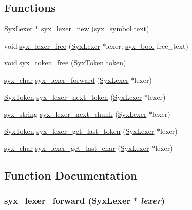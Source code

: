 \subsection*{Functions}
\begin{CompactItemize}
\item 
\hyperlink{struct_syx_lexer}{SyxLexer} $\ast$ \hyperlink{syx-lexer_8c_a9c6c122b1b37e06487284478ba914e1}{syx\_\-lexer\_\-new} (\hyperlink{syx-types_8h_9663af54b7b72f5d8be5f754ef356525}{syx\_\-symbol} text)
\item 
void \hyperlink{syx-lexer_8c_d89a4d0325732438808e9777acd52668}{syx\_\-lexer\_\-free} (\hyperlink{struct_syx_lexer}{SyxLexer} $\ast$lexer, \hyperlink{syx-types_8h_c6dc09b276b99fa1956364359139daab}{syx\_\-bool} free\_\-text)
\item 
void \hyperlink{syx-lexer_8c_5e759dcd70d8f633018d9687de77ff1e}{syx\_\-token\_\-free} (\hyperlink{struct_syx_token}{SyxToken} token)
\item 
\hyperlink{syx-types_8h_22636fad803dd674d2640c323df20a11}{syx\_\-char} \hyperlink{syx-lexer_8c_4fe0090bc88c108a076eed9a28126b2e}{syx\_\-lexer\_\-forward} (\hyperlink{struct_syx_lexer}{SyxLexer} $\ast$lexer)
\item 
\hyperlink{struct_syx_token}{SyxToken} \hyperlink{syx-lexer_8c_3d0ff30aeb654ef8a933b906f96dc483}{syx\_\-lexer\_\-next\_\-token} (\hyperlink{struct_syx_lexer}{SyxLexer} $\ast$lexer)
\item 
\hyperlink{syx-types_8h_1bff1fd86072dd98849437bc9dcb35c3}{syx\_\-string} \hyperlink{syx-lexer_8c_b3f87e9420db1b5b6db7b5534d27411b}{syx\_\-lexer\_\-next\_\-chunk} (\hyperlink{struct_syx_lexer}{SyxLexer} $\ast$lexer)
\item 
\hyperlink{struct_syx_token}{SyxToken} \hyperlink{syx-lexer_8c_60d30b9d8152c9caa210c1bdeba9b689}{syx\_\-lexer\_\-get\_\-last\_\-token} (\hyperlink{struct_syx_lexer}{SyxLexer} $\ast$lexer)
\item 
\hyperlink{syx-types_8h_22636fad803dd674d2640c323df20a11}{syx\_\-char} \hyperlink{syx-lexer_8c_ee55d47dda81e68468848c74abfa90eb}{syx\_\-lexer\_\-get\_\-last\_\-char} (\hyperlink{struct_syx_lexer}{SyxLexer} $\ast$lexer)
\end{CompactItemize}


\subsection{Function Documentation}
\hypertarget{syx-lexer_8c_4fe0090bc88c108a076eed9a28126b2e}{
\subsubsection{ syx\_\-lexer\_\-forward ({\bf SyxLexer} $\ast$ {\em lexer})}}
\label{syx-lexer_8c_4fe0090bc88c108a076eed9a28126b2e}


